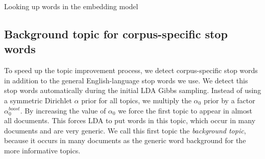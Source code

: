 \documentclass[
        a4paper,
        titlepage,
        twoside,
        parskip
        ]{scrbook}
\theoremstyle{break}
\begin{document}
\begin{algorithm}
  \caption{Looking up words in the embedding model}
  \label{alg:vocabulary_matching}
  \begin{algorithmic}[1]
      \State{}
      \State{}
      \State{}
    \Else
    \EndIf
    \EndProcedure
  \end{algorithmic}
\end{algorithm}

\subsection{Background topic for corpus-specific stop words}
To speed up the topic improvement process, we detect corpus-specific stop words in addition to the general English-language stop words we use.
We detect this stop words automatically during the initial LDA Gibbs sampling.
Instead of using a symmetric Dirichlet $\alpha$ prior for all topics, we multiply the $\alpha_0$ prior by a factor $\alpha_0^{boost}$.
By increasing the value of $\alpha_0$ we force the first topic to appear in almost all documents.
This forces LDA to put words in this topic, which occur in many documents and are very generic.
We call this first topic the \emph{background topic}, because it occurs in many documents as the generic word background for the more informative topics.
\end{document}
